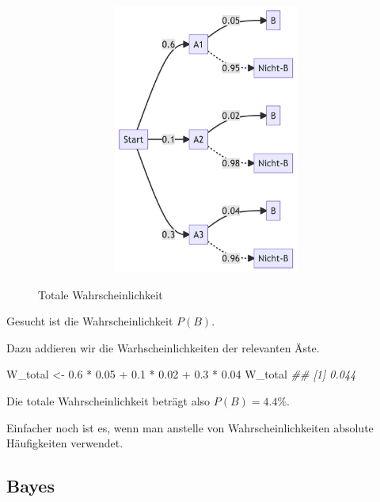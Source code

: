 \documentclass[
  a4paper,
  DIV=11]{scrreprt}
\newenvironment{Shaded}{\begin{snugshade}}{\end{snugshade}}
\newcommand{\DocumentationTok}[1]{\textcolor[rgb]{0.37,0.37,0.37}{\textit{#1}}}
\newcommand{\FloatTok}[1]{\textcolor[rgb]{0.68,0.00,0.00}{#1}}
\newcommand{\NormalTok}[1]{\textcolor[rgb]{0.00,0.23,0.31}{#1}}
\newcommand{\OtherTok}[1]{\textcolor[rgb]{0.00,0.23,0.31}{#1}}
\newcommand{\SpecialCharTok}[1]{\textcolor[rgb]{0.37,0.37,0.37}{#1}}
\theoremstyle{definition}
\theoremstyle{remark}
\begin{document}
\begin{figure}

{\centering 

\begin{figure}[H]

{\centering \includegraphics[width=5.5in,height=3.5in]{./Wskt_files/figure-latex/mermaid-figure-3.png}

}

\end{figure}

}

\caption{\label{fig-tot-wskt}Totale Wahrscheinlichkeit}

\end{figure}

Gesucht ist die Wahrscheinlichkeit \(P(B)\).

Dazu addieren wir die Warhscheinlichkeiten der relevanten Äste.

\begin{Shaded}
\begin{Highlighting}[]
\NormalTok{W\_total }\OtherTok{\textless{}{-}} \FloatTok{0.6} \SpecialCharTok{*} \FloatTok{0.05} \SpecialCharTok{+} \FloatTok{0.1} \SpecialCharTok{*} \FloatTok{0.02} \SpecialCharTok{+} \FloatTok{0.3} \SpecialCharTok{*} \FloatTok{0.04}
\NormalTok{W\_total}
\DocumentationTok{\#\# [1] 0.044}
\end{Highlighting}
\end{Shaded}

Die totale Wahrscheinlichkeit beträgt also \(P(B) = 4.4\%\).

Einfacher noch ist es, wenn man anstelle von Wahrscheinlichkeiten
absolute Häufigkeiten verwendet.

\hypertarget{bayes}{%
\subsection{Bayes}\label{bayes}}
\end{document}

